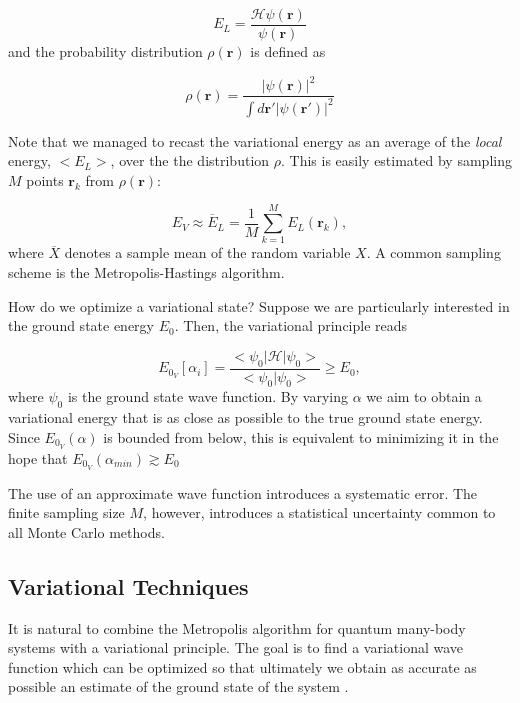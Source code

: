 \begin{equation}\label{eq:local_energy}
E_L = \frac{\mathcal{H} \psi (\bm r) }{\psi (\bm r)}
\end{equation}
and the probability distribution $\rho (\bm r)$ is defined as

\begin{equation}\label{eq:rho}
\rho (\bm r) = \frac{ | \psi (\bm r) |^2}{ \int d\bm r' | \psi (\bm r') |^2}
\end{equation}

Note that we managed to recast the variational energy as an average  of the \emph{local} energy, $< E_L > $, over the the distribution $\rho$. This is easily estimated by sampling $M$ points $\bm r_k$ from $\rho (\bm r)$:

\begin{equation}\label{eq:average}
E_V \approx \overline E_L = \frac{1}{M} \sum_{k= 1}^{M} E_L (\bm r_k) ,
\end{equation}
where $\overline {X}$ denotes a sample mean of the random variable $X$. A common sampling scheme is the Metropolis-Hastings algorithm.

How do we optimize a variational state? Suppose we are particularly interested in the ground state energy $E_0$. Then, the variational principle reads

\begin{equation}
E_{0_V}[\alpha_i] = \frac{< \psi_0 | \mathcal{H} | \psi_0 >}{<\psi_0 | \psi_0>} \ge E_0,
\end{equation}
where $\psi_0$ is the ground state wave function. By varying $\alpha$ we aim to obtain a variational energy that is as close as possible to the true ground state energy. Since $E_{0_V}(\alpha)$ is bounded from below, this is equivalent to minimizing it in the hope that $E_{0_V}(\alpha_{min}) \gtrsim E_0$ 

The use of an approximate wave function introduces a systematic error. The finite sampling size $M$, however, introduces a statistical uncertainty common to all Monte Carlo methods. 

\subsection{Variational Techniques}

It is natural to combine the Metropolis algorithm for quantum many-body systems with a variational principle. The goal is to find a variational wave function which can be optimized so that ultimately we obtain as accurate as possible an estimate of the ground state of the system \cite{tao}.\par

